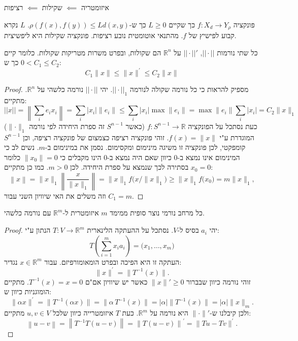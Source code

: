 \documentclass{tstextbook}
\begin{document}
\begin{proposition}
איזומטריה \(\impliedby\) שקילות \(\impliedby\) רציפות

\end{proposition}
\begin{definition}
פונקציה \(f:X_{d}\to Y_{\rho}\) כך שקיים \(L\geq0\) כך ש-\(\rho(f(x),f(y))\leq Ld(x,y)\). \(L\) נקרא קבוע לפישיץ של \(f\). מהתנאי אוטומטית נובע רציפות. פונקציה שקילות היא ליפשיצית.

\end{definition}
\begin{proposition}
כל שתי נורמות \(|| \cdot ||\), \(|| \cdot ||'\) על \(\mathbb{R}^n\) הם שקולות, ובפרט משרות מטריקות שקולות.
כלומר קיים \(0<C_{1}\leq C_{2}\) כך ש:
$$C_{1}\|x\|\leq\|x\|^{\prime}\leq C_{2}\|x\|$$

\end{proposition}
\begin{proof}
מספיק להראות כי כל נורמה שקולה לנורמה \(||\cdot||_{1}\). יהי \(||\cdot||\) נורמה כלשהי על \(\mathbb{R} ^n\). מתקיים:
$$||x||=  \left\lVert  \sum_{i} e_{i}x_{i}  \right\rVert = \sum_{i}\lvert x_{i} \rvert \lVert e_{i} \rVert \leq \sum_{i}\lvert x_{i} \rvert \max \lVert e_{i} \rVert =\max\lVert e_{i} \rVert \sum_{i}\lvert x_{i} \rvert =C_{2}\lVert x \rVert_{1} $$
כעת נסתכל על הפונקציה \(f:S^{n-1}\to\mathbb{R}\) (כאשר \(S^{n-1}\) זה ספרת היחידה לפי נורמה \(\lVert \cdot \rVert_{1}\)) המוגדרת ע"י \(f(x)=\lVert x \rVert\). זוהי פונקציה רציפה כצמצום של פונקציה רציפה, וכן \(S^{n-1}\) קומפקטי, לכן פונקציה זו משיגה מינימום ומקסימום. נסמן את במינימום ב-\(m\). נשים לב כי המינימום אינו נמצא ב-0 כיוון שאם היה נמצא ב-0 הינו מקבלים כי \(\lVert x_{0} \rVert=0\) כלומר \(x_{0}=0\) בסתירה לכך שנמצא על ספרת היחידה. לכן \(m>0\). כמו כן מתקיים:
$$\left\|x\right\|=\|x\|_{1}\left\|{\frac{x}{\|x\|_{1}}}\right\|=\|x\|_{1}f{\big(}x/\|x\|_{1}{\big)}\geq\|x\|_{1}f{\big(}x_{0}{\big)}=m\|x\|_{1},$$
וזה משלים את האי שיוויון השני עבור \(C_{1}=m\).

\end{proof}
\begin{proposition}
כל מרחב נורמי נוצר סופית ממימד \(m\) איזומטרית ל-\(\mathbb{R}^m\)  עם נורמה כלשהי.

\end{proposition}
\begin{proof}
יהי \(a_{i}\) בסיס ל-\(V\). נסתכל על ההעתקה הלינארית \(T:V\to \mathbb{R}^m\) הנתון ע"י:
$$T\left(\sum_{i=1}^{m}x_{i}a_{i}\right)=\big(x_{1},\ldots,x_{m}\big)$$
העתקה זו היא הפיכה ובפרט הומאומורפיזם. עבור \(x \in \mathbb{R}^m\) נגדיר:
$$\lVert x \rVert ^{\prime}=\|T^{-1}(x)\|.$$
זוהי נורמה כיוון שבברור \(\lVert x \rVert'\geq 0\)  כאשר יש שיוויון אם"ם \(T^{-1}(x)=x=0\). מתקיים הומוגניות כיוון ש:
$$\|\alpha x\|^{\prime}=\|T^{-1}(\alpha x)\|=\|\alpha\,T^{-1}(x)\|=|\alpha|\|T^{-1}(x)\|=|\alpha|\|x\|_{m}.$$
ולכן קיבלנו ש-\(\lVert \cdot \rVert'\) היא נורמה על \(\mathbb{R}^m\). כעת \(T\) איזומטרייה כיוון שלכל \(u,v\in V\) מתקיים:
$$\left\|u- v \right\|=\left\|T^{-1}T(u-v)\right\|=\left\|T(u-v)\right\|^{\prime}=\|T u-Tv\|^{\prime}.$$

\end{proof}
\end{document}
